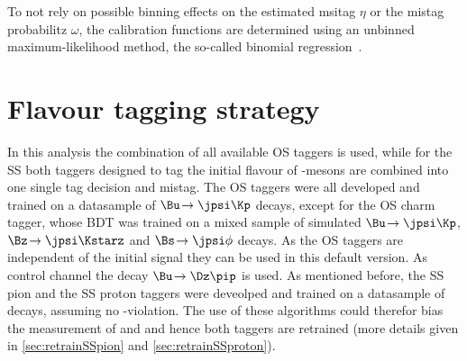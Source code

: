 To not rely on possible binning effects on the estimated msitag $\eta$ or the mistag probabilitz $\omega$, the calibration functions are determined using an unbinned maximum-likelihood method, the so-called binomial regression~\cite{BinRegression}.

\section{Flavour tagging strategy}
\label{sec:taggingstrategy}

In this analysis the combination of all available OS taggers is used, while for the SS both taggers designed to tag the initial flavour of \Bz-mesons are combined into one single tag decision and mistag.
The OS taggers were all developed and trained on a datasample of $\Bu\!\to\jpsi\Kp$ decays, except for the OS charm tagger, whose BDT was trained on a mixed sample of simulated $\Bu\!\to\jpsi\Kp$, $\Bz\!\to\jpsi\Kstarz$ and $\Bs\!\to\jpsi\phi$ decays.
As the OS taggers are independent of the initial signal \B they can be used in this default version.
As control channel the decay $\Bu\!\to\Dz\pip$ is used.
As mentioned before, the SS pion and the SS proton taggers were deveolped and trained on a datasample of \BdToDpi decays, assuming no \CP-violation.
The use of these algorithms could therefor bias the measurement of \Sf and \Sfbar and hence both taggers are retrained (more details given in \cref{sec:retrainSSpion} and \cref{sec:retrainSSproton}).

